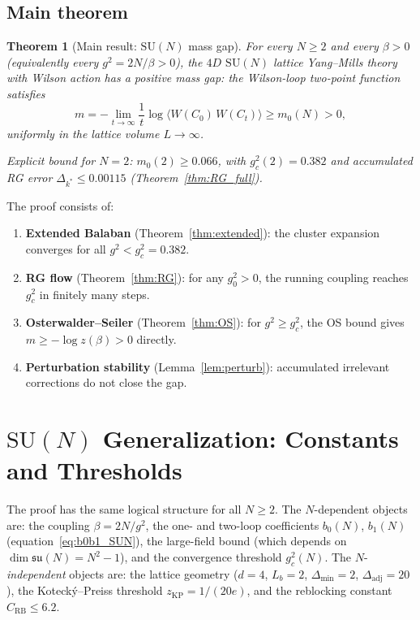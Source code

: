 \documentclass[11pt,a4paper]{amsart}
\newtheorem{theorem}{Theorem}[section]
\theoremstyle{definition}
\newcommand{\SU}{\mathrm{SU}}
\newcommand{\su}{\mathfrak{su}}
\newcommand{\Del}{\Delta_{\min}}
\newcommand{\gB}{g^2_c}
\newcommand{\zKP}{z_{\mathrm{KP}}}
\newcommand{\CRB}{C_{\mathrm{RB}}}
\begin{document}
\subsection{Main theorem}

\begin{theorem}[Main result: $\SU(N)$ mass gap]
\label{thm:main}
For every $N \ge 2$ and every $\beta > 0$ (equivalently every $g^2 = 2N/\beta > 0$),
the $4D$ $\SU(N)$ lattice Yang--Mills theory with Wilson action has a positive
mass gap: the Wilson-loop two-point function satisfies
\[
  m = -\lim_{t\to\infty} \frac{1}{t}\log\langle W(C_0)\,W(C_t)\rangle
  \ge m_0(N) > 0,
\]
uniformly in the lattice volume $L\to\infty$.

\noindent\emph{Explicit bound for $N=2$:}
$m_0(2) \ge 0.066$, with $g^2_c(2) = 0.382$ and accumulated RG error
$\Delta_{k^*}\le 0.00115$ (Theorem~\ref{thm:RG_full}).
\end{theorem}

The proof consists of:
\begin{enumerate}[label=(\roman*)]
\item \textbf{Extended Balaban} (Theorem~\ref{thm:extended}):
      the cluster expansion converges for all $g^2 < \gB = 0.382$.
\item \textbf{RG flow} (Theorem~\ref{thm:RG}):
      for any $g^2_0 > 0$, the running coupling reaches $\gB$ in finitely many steps.
\item \textbf{Osterwalder--Seiler} (Theorem~\ref{thm:OS}):
      for $g^2 \ge \gB$, the OS bound gives $m \ge -\log z(\beta) > 0$ directly.
\item \textbf{Perturbation stability} (Lemma~\ref{lem:perturb}):
      accumulated irrelevant corrections do not close the gap.
\end{enumerate}

\section{$\SU(N)$ Generalization: Constants and Thresholds}
\label{sec:SUN_general}

The proof has the same logical structure for all $N \ge 2$.
The $N$-dependent objects are: the coupling $\beta = 2N/g^2$,
the one- and two-loop coefficients $b_0(N)$, $b_1(N)$
(equation~\eqref{eq:b0b1_SUN}), the large-field bound (which depends on
$\dim\su(N) = N^2-1$), and the convergence threshold $g^2_c(N)$.
The $N$-\emph{independent} objects are: the lattice geometry
($d=4$, $L_b=2$, $\Del = 2$, $\Delta_{\mathrm{adj}} = 20$),
the Koteck\'y--Preiss threshold $\zKP = 1/(20e)$,
and the reblocking constant $\CRB \le 6.2$.
\end{document}

